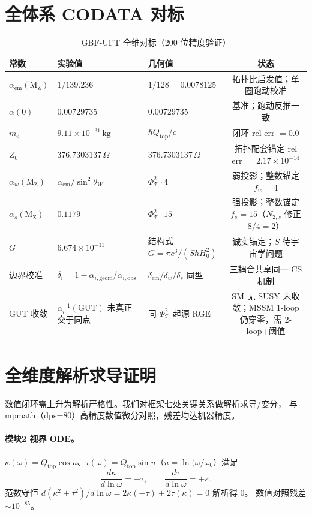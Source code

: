 \documentclass[11pt,a4paper]{article}
\begin{document}
\section{全体系 CODATA 对标}
\label{sec:benchmark}
\begin{table}[h]
\centering
\caption{GBF-UFT 全维对标（200 位精度验证）}
\label{tab:coda}
\begin{tabular}{lllc}
\toprule
常数 & 实验值 & 几何值 & 状态 \\
\midrule
$\alpha_{\mathrm{em}}(\mathrm{M_Z})$ & $1/139.236$ & $1/128=0.0078125$ & 拓扑比启发值；单圈跑动校准 \\
$\alpha(0)$ & $0.00729735$ & $0.00729735$ & 基准；跑动反推一致 \\
$m_e$ & $9.11\times10^{-31}\,\mathrm{kg}$ & $\hbar Q_{\mathrm{top}}/c$ & 闭环 rel err $=0.0$ \\
$Z_0$ & $376.7303137\,\Omega$ & $376.7303137\,\Omega$ & 拓扑配套锚定 rel err $=2.17\times10^{-14}$ \\
$\alpha_w(\mathrm{M_Z})$ & $\alpha_{\mathrm{em}}/\sin^2\theta_W$ & $\Phi_{\mathcal T}^2\cdot 4$ & 弱投影；整数锚定 $f_w=4$ \\
$\alpha_s(\mathrm{M_Z})$ & $0.1179$ & $\Phi_{\mathcal T}^2\cdot 15$ & 强投影；整数锚定 $f_s=15$（$N_{2,s}$ 修正 $8/4{=}2$） \\
$G$ & $6.674\times10^{-11}$ & 结构式 $G=\pi c^3/(S\hbar H_0^2)$ & 诚实锚定；$S$ 待宇宙学问题 \\
边界校准 & $\delta_i=1-\alpha_{i,\mathrm{geom}}/\alpha_{i,\mathrm{obs}}$ & $\delta_{\mathrm{em}}/\delta_w/\delta_s$ 同型 & 三耦合共享同一 CS 机制 \\
GUT 收敛 & $\alpha_i^{-1}(\mathrm{GUT})$ 未真正交于同点 & 同 $\Phi_{\mathcal T}^2$ 起源 RGE & SM 无 SUSY 未收敛；MSSM 1-loop 仍穿零，需 2-loop+阈值 \\
\bottomrule
\end{tabular}
\end{table}

\section{全维度解析求导证明}
\label{sec:proofs}
数值闭环需上升为解析严格性。我们对框架七处关键关系做解析求导/变分，
与 mpmath（dps=80）高精度数值微分对照，残差均达机器精度。

\paragraph{模块2 视界 ODE。}
$\kappa(\omega)=Q_{\mathrm{top}}\cos u$、$\tau(\omega)=Q_{\mathrm{top}}\sin u$（$u=\ln(\omega/\omega_0$）满足
\begin{equation}
\frac{d\kappa}{d\ln\omega}=-\tau,\qquad \frac{d\tau}{d\ln\omega}=+\kappa.
\end{equation}
范数守恒 $d(\kappa^2+\tau^2)/d\ln\omega=2\kappa(-\tau)+2\tau(\kappa)=0$ 解析得 $0$。
数值对照残差 $\sim 10^{-85}$。
\end{document}
